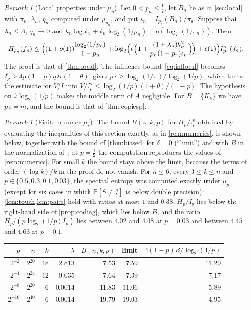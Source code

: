 \documentclass[11pt]{amsart}
\theoremstyle{remark}
\newtheorem{remark}[theorem]{Remark}
\renewcommand{\Pr}{\mathbb{P}}
\begin{document}
\begin{remark}[Local properties under $\mu_p$]\label{rem:localp}
Let $0<p_n\le\frac12$, let $B_n$ be as in \cref{sec:local} with $\pi_n$, $\lambda_n$, $\eta_n$ computed under
$\mu_{p_n}$, and put $\iota_n=I_{p_n}(B_n)/\pi_n$. Suppose that $\lambda_n\le\Lambda$, $\eta_n\to0$ and
$k_n\log k_n+k_n\log_2(1/p_n)=o(\log_2(1/\pi_n))$. Then
\[
H_{p_n}(f_n)\le\Bigl((1+o(1))\frac{\log_2(1/p_n)}{1-p_n}
+\log_2\Bigl(e\Bigl(1+\frac{(1+\lambda_n)k_n^2}{p_n(1-p_n)\iota_n}\Bigr)\Bigr)+o(1)\Bigr)I^{\mathrm s}_{p_n}(f_n).
\]
The proof is that of \cref{thm:local}. The influence bound~\eqref{eq:inflocal} becomes
$I^{\mathrm s}_p\ge4p(1-p)q\lambda\iota(1-\theta)$.  gives $p\,\iota\ge\log_2(1/\pi)/\log_2(1/p)$, which
turns the estimate for $V/I$ into $V/I^{\mathrm s}_p\le\log_2(1/p)(1+\theta)/(1-p)$. The hypothesis on
$k\log_2(1/p)$ makes the middle term of $A$ negligible. For $B=\{K_k\}$ we have $p\,\iota=m$, and the bound is that of
\cref{thm:copiesp}.
\end{remark}

\begin{remark}[Finite $n$ under $\mu_p$]\label{rem:numericsp}
The bound $B(n,k,p)$ for $H_p/I^{\mathrm s}_p$ obtained by evaluating the inequalities of this section exactly, as in
\cref{rem:numerics}, is shown below, together with the bound of \cref{thm:biased} for $\delta=0$ (``limit'') and with $B$ in the
normalization of~\cite{KMS12}; at $p=\frac12$ the computation reproduces the values of \cref{rem:numerics}. For
small $k$ the bound stays above the limit, because the terms of order $(\log k)/k$ in the proof do not vanish. For $n\le6$, every $3\le k\le n$ and
$p\in\{0.5,0.3,0.1,0.03\}$, the spectral entropy was computed exactly under $\mu_p$ (except for six cases in which
$\Pr[S\neq\emptyset]$ is below double precision): \cref{lem:touch,lem:pairs} hold with ratios at most $1$ and $0.38$,
$H_p/I^{\mathrm s}_p$ lies below the right-hand side of \cref{prop:coding}, which lies below $B$, and the ratio
$H_p/(p\log_2(1/p)I_p)$ lies between $4.02$ and $4.08$ at $p=0.03$ and between $4.45$ and $4.63$ at $p=0.1$.
\begin{center}
\begin{tabular}{rrrrrrr}
\toprule
$p$ & $n$ & $k$ & $\lambda$ & $B(n,k,p)$ & limit & $4(1-p)B/\log_2(1/p)$\\
\midrule
$2^{-2}$ & $2^{20}$ & $18$ & $2.813$ & $7.53$ & $7.59$ & $11.29$\\
$2^{-4}$ & $2^{24}$ & $12$ & $0.035$ & $7.64$ & $7.39$ & $7.17$\\
$2^{-8}$ & $2^{20}$ & $6$ & $0.0014$ & $11.83$ & $11.06$ & $5.89$\\
$2^{-16}$ & $2^{40}$ & $6$ & $0.0014$ & $19.79$ & $19.03$ & $4.95$\\
\bottomrule
\end{tabular}
\end{center}
\end{remark}
\end{document}
